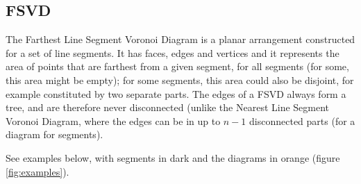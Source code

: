 \documentclass[11pt,a4paper,english]{article}
\begin{document}
	\subsection{FSVD}
	
	The Farthest Line Segment Voronoi Diagram is a planar arrangement  constructed for a set of line segments. It has faces, edges and vertices and it represents the area of points that are farthest from a given segment, for all segments (for some, this area might be empty); for some segments, this area could also be disjoint, for example constituted by two separate parts. The edges of a FSVD always form a tree, and are therefore never disconnected (unlike the Nearest Line Segment Voronoi Diagram, where the edges can be in up to \(n -1\) disconnected parts (for a diagram for \n segments).\par
	See examples below, with segments in dark and the diagrams in orange (figure \ref{fig:examples}).
	
\end{document}
